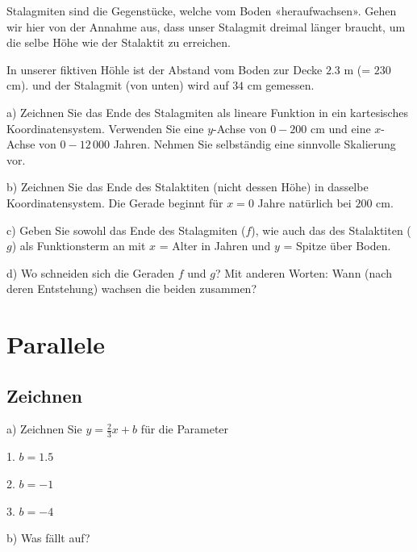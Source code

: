 Stalagmiten sind die Gegenstücke, welche vom Boden
«heraufwachsen». Gehen wir hier von der Annahme aus, dass unser
Stalagmit dreimal länger braucht, um die selbe Höhe wie der Stalaktit zu erreichen.

In unserer fiktiven Höhle ist der Abstand vom Boden zur Decke $2.3$ m
(= $230$ cm). und der Stalagmit (von unten) wird auf $34$ cm gemessen.

a) Zeichnen Sie das Ende des Stalagmiten als
lineare Funktion in ein kartesisches Koordinatensystem. Verwenden Sie
eine $y$-Achse von $0 - 200$ cm und eine $x$-Achse von $0-12\,000$
Jahren. Nehmen Sie selbständig eine sinnvolle Skalierung vor.


b) Zeichnen Sie das Ende des Stalaktiten (nicht dessen Höhe) in
dasselbe Koordinatensystem. Die Gerade beginnt für $x=0$ Jahre
natürlich bei $200$ cm.
\newpage

c) Geben Sie sowohl das Ende des Stalagmiten ($f$), wie auch das des
Stalaktiten ($g$) als Funktionsterm an mit $x$ = Alter in Jahren und
$y$ = Spitze über Boden.



d) Wo schneiden sich die Geraden $f$ und $g$? Mit anderen Worten: Wann
(nach deren Entstehung) wachsen die beiden zusammen?


\section{Parallele}
\subsection{Zeichnen}
a) Zeichnen Sie $y=\frac23x+b$ für die Parameter

1. $b=1.5$

2. $b=-1$

3. $b= -4$


b) Was fällt auf?
\newpage

